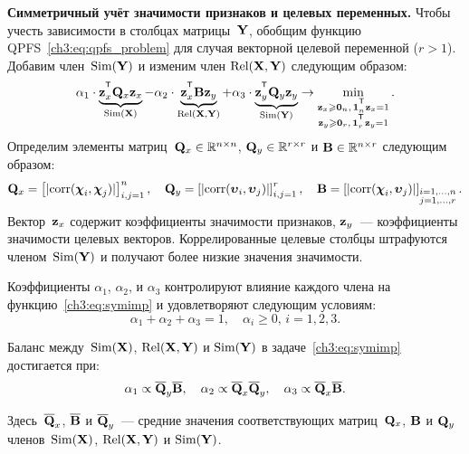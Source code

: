 \documentclass[11pt, a5paper]{dissert}
\begin{document}
\textbf{Симметричный учёт значимости признаков и целевых переменных.}
Чтобы учесть зависимости в столбцах матрицы~$\mathbf{Y}$, обобщим функцию QPFS~\eqref{ch3:eq:qpfs_problem} для случая векторной целевой переменной ($r > 1$).
Добавим член~$\text{Sim}(\mathbf{Y})$ и изменим член $\text{Rel}(\mathbf{X}, \mathbf{Y})$ следующим образом:
\begin{equation}
	\alpha_1 \cdot \underbrace{\bz_x^{\T} \bQ_x \bz_x}_{\text{Sim}(\bX)} - \alpha_2 \cdot \underbrace{\bz_x^{\T} \bB \bz_y}_{\text{Rel}(\bX, \bY)} + \alpha_3 \cdot \underbrace{\bz_y^{\T} \bQ_y \bz_y}_{\text{Sim}(\bY)} \rightarrow \min_{\substack{\bz_x \geq \bZero_n, \, \bOne_n^{\T}\bz_x=1 \\ \bz_y \geq \bZero_r, \, \bOne_r^{\T}\bz_y=1}}.
	\label{ch3:eq:symimp}
\end{equation}
Определим элементы матриц~$\mathbf{Q}_x \in \mathbb{R}^{n \times n}$, $\mathbf{Q}_y \in \mathbb{R}^{r \times r}$ и $\mathbf{B} \in \mathbb{R}^{n \times r}$ следующим образом:
\begin{equation*}
	\mathbf{Q}_x = \left[ |\text{corr}(\boldsymbol{\chi}_i, \boldsymbol{\chi}_j)| \right]_{i,j=1}^n, \quad
	\mathbf{Q}_y = \left[ |\text{corr}(\boldsymbol{\upsilon}_i, \boldsymbol{\upsilon}_j)| \right]_{i,j=1}^r, \quad
	\mathbf{B} =  \left[ |\text{corr}(\boldsymbol{\chi}_i, \boldsymbol{\upsilon}_j)| \right]_{\substack{i=1, \dots, n \\ j=1, \dots, r}}.
\end{equation*}
Вектор~$\mathbf{z}_x$ содержит коэффициенты значимости признаков, $\mathbf{z}_y$~--- коэффициенты значимости целевых векторов.
Коррелированные целевые столбцы штрафуются членом~$\text{Sim}(\mathbf{Y})$ и получают более низкие значения значимости.

Коэффициенты $\alpha_1$, $\alpha_2$, и $\alpha_3$ контролируют влияние каждого члена на функцию~\eqref{ch3:eq:symimp} и удовлетворяют следующим условиям:
\begin{equation*}
	\alpha_1 + \alpha_2 + \alpha_3 = 1, \quad \alpha_i \geq 0, \, i = 1, 2, 3.
\end{equation*}
\begin{statement}
	Баланс между~$\text{Sim}(\mathbf{X})$, $\text{Rel}(\mathbf{X}, \mathbf{Y})$ и $\text{Sim}(\mathbf{Y})$ в  задаче~\eqref{ch3:eq:symimp} достигается при:
	\begin{equation}
	\alpha_1 \propto \overline{\mathbf{Q}}_y \overline{\mathbf{B}}, \quad
	\alpha_2 \propto \overline{\mathbf{Q}}_x \overline{\mathbf{Q}}_y, \quad
	\alpha_3  \propto \overline{\mathbf{Q}}_x \overline{\mathbf{B}}.
	\label{ch3:eq:alpha_3}
	\end{equation}
\end{statement}
Здесь~$\overline{\mathbf{Q}}_x$, $\overline{\mathbf{B}}$ и $\overline{\mathbf{Q}}_y$~--- средние значения соответствующих матриц~$\mathbf{Q}_x$, $\mathbf{B}$ и $\mathbf{Q}_y$ членов~$\text{Sim}(\mathbf{X})$, $\text{Rel}(\mathbf{X}, \mathbf{Y})$ и $\text{Sim}(\mathbf{Y})$.
\end{document}
